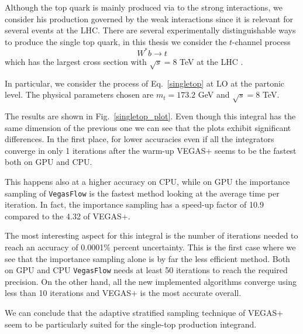 \documentclass[../main/main.tex]{subfiles}
\begin{document}
Although the top quark is mainly produced via to the strong interactions, we consider his production governed by the weak interactions since it is relevant for several events at the LHC. There are several experimentally distinguishable ways to produce the single top quark, in this thesis we consider the $t$-channel process 
\begin{equation}
	\label{singletop}
	W^* b \to t 
\end{equation}
which has the largest cross section with  $\sqrt{s} = 8$ TeV at the LHC \cite{Brucherseifer_2014}.

In particular, we consider the process of Eq.~\ref{singletop} at LO at the partonic level. The physical parameters chosen are $m_t = 173.2$ GeV and $\sqrt{s} = 8$ TeV.

The results are shown in Fig.~\ref{singletop_plot}.
Even though this integral has the same dimension of the previous one we can see that the plots exhibit significant differences.
In the first place, for lower accuracies even if all the integrators converge in only 1 iterations after the warm-up VEGAS+ seems to be the fastest both on GPU and CPU. 

This happens also at a higher accuracy on CPU, while on GPU the importance sampling of \texttt{VegasFlow} is the fastest method looking at the average time per iteration. In fact, the importance sampling has a speed-up factor of 10.9 compared to the 4.32 of VEGAS+.

The most interesting aspect for this integral is the number of iterations needed to reach an accuracy of 0.0001\% percent uncertainty.  This is the first case where we see that the importance sampling alone is by far the less efficient method. Both on GPU and CPU \texttt{VegasFlow} needs at least 50 iterations to reach the required precision. On the other hand, all the new implemented algorithms converge using less than 10 iterations and VEGAS+ is the most accurate overall.

We can conclude that the adaptive stratified sampling technique of VEGAS+ seem to be particularly suited for the single-top production integrand.
\end{document}
